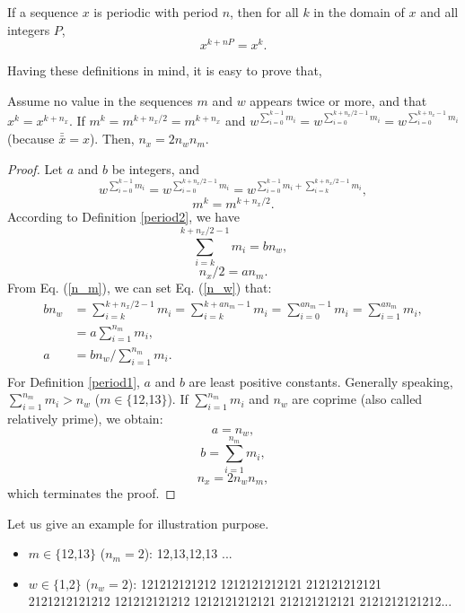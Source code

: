 \begin{definition}
If a sequence $x$ is periodic with period $n$, then for all $k$ in the domain of $x$ and all integers $P$,
$$x^{k + nP} = x^{k}.$$
\label{period2}
\end{definition}

Having these definitions in mind, it is easy to prove that,
\begin{proposition}
Assume no value in the sequences $m$ and $w$ appears twice or more, and that $x^{k}=x^{k+n_x}$. If $m^{k}=m^{k+n_x/2}=m^{k+n_x}$ and $w^{\sum_{i=0}^{k-1}m_i}=w^{\sum_{i=0}^{k+n_x/2-1}m_i}=w^{\sum_{i=0}^{k+n_x-1}m_i}$(because $\bar{\bar{x}}=x$).
Then, $n_x=2n_wn_m$.
\end{proposition}
\begin{proof}
Let $a$ and $b$ be integers, and
$$w^{\sum_{i=0}^{k-1}m_i}=w^{\sum_{i=0}^{k+n_x/2-1}m_i}=w^{\sum_{i=0}^{k-1}m_i+\sum_{i=k}^{k+n_x/2-1}m_i},$$
$$m^{k}=m^{k+n_x/2}.$$
According to Definition \ref{period2}, we have
 \begin{equation}
\label{n_w}
\sum_{i=k}^{k+n_x/2-1}m_i=bn_w,
\end{equation}
\begin{equation}
\label{n_m}
n_x/2=an_m.
\end{equation}
From Eq. (\ref{n_m}), we can set Eq. (\ref{n_w}) that:
 \begin{equation}
\begin{array}{ll}
bn_w&=\sum_{i=k}^{k+n_x/2-1}m_i=\sum_{i=k}^{k+an_m-1}m_i=\sum_{i=0}^{an_m-1}m_i=\sum_{i=1}^{an_m}m_i,\\
&=a\sum_{i=1}^{n_m}m_i,\\
a&=bn_w/\sum_{i=1}^{n_m}m_i.\\
\end{array}
\end{equation}
For Definition \ref{period1}, $a$ and $b$ are least positive constants. Generally speaking, $\sum_{i=1}^{n_m}m_i>n_w$ ($m \in \{$12,13$\}$). If $\sum_{i=1}^{n_m}m_i$ and $n_w$ are coprime (also called relatively prime), we obtain:
$$a=n_w,$$
$$b=\sum_{i=1}^{n_m}m_i,$$
$$n_x=2n_wn_m,$$
which terminates the proof.
\end{proof}
Let us give an example for illustration purpose.
\begin{itemize}
\item $m \in \{$12,13$\}$ ($n_m=2$): 12,13,12,13 ...

\item $w \in \{$1,2$\}$ ($n_w=2$): 121212121212 1212121212121 212121212121 2121212121212 121212121212 1212121212121 212121212121 2121212121212...

\end{itemize}

